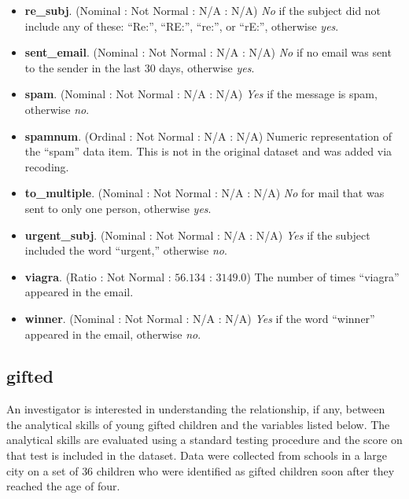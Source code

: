 \begin{itemize}
  \item \textbf{re\_subj}. (Nominal : Not Normal : N/A : N/A) \textit{No} if the subject did not include any of these: ``Re:'', ``RE:'', ``re:'', or ``rE:'', otherwise \textit{yes}.
  \item \textbf{sent\_email}. (Nominal : Not Normal : N/A : N/A) \textit{No} if no email was sent to the sender in the last $ 30 $ days, otherwise \textit{yes}.
  \item \textbf{spam}. (Nominal : Not Normal : N/A : N/A) \textit{Yes} if the message is spam, otherwise \textit{no}.
  \item \textbf{spamnum}. (Ordinal : Not Normal : N/A : N/A)  Numeric representation of the ``spam'' data item. This is not in the original dataset and was added via recoding.
  \item \textbf{to\_multiple}. (Nominal : Not Normal : N/A : N/A) \textit{No} for mail that was sent to only one person, otherwise \textit{yes}.
  \item \textbf{urgent\_subj}. (Nominal : Not Normal : N/A : N/A) \textit{Yes} if the subject included the word ``urgent,'' otherwise \textit{no}.
  \item \textbf{viagra}. (Ratio : Not Normal : $ 56.134 $ : $ 3149.0 $) The number of times ``viagra'' appeared in the email.
  \item \textbf{winner}. (Nominal : Not Normal : N/A : N/A) \textit{Yes} if the word ``winner'' appeared in the email, otherwise \textit{no}.
\end{itemize}

\subsection{gifted}

An investigator is interested in understanding the relationship, if any, between the analytical skills of young gifted children and the variables listed below. The analytical skills are evaluated using a standard testing procedure and the score on that test is included in the dataset. Data were collected from schools in a large city on a set of $ 36 $ children who were identified as gifted children soon after they reached the age of four.

